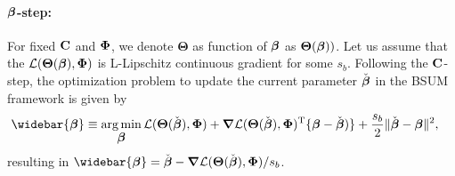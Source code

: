 \documentclass[12pt]{article}
\def\trans{^{\rm T}}
\newcommand{\bbL}{\mathcal{L}}
\DeclareMathOperator*{\argmin}{arg\,min}
\newcommand{\bs}{\boldsymbol}
\DeclareMathOperator{\Tr}{tr}
\begin{document}




\paragraph{$\mbox{\boldmath $\beta$}$-step:}\label{par:beta}
For fixed  ${\bf C}$ and $\mbox{\boldmath $\Phi$}$, we denote $\bs\Theta$ as function of $\mbox{\boldmath $\beta$}$ as $\bs\Theta(\bbeta))$. 
Let us assume that the $\bbL(\bs\Theta(\bbeta),\bPhi)$ is  L-Lipschitz continuous gradient for some $s_b$. Following the ${\bf C}$-step, the optimization problem to update the current parameter $\check{\mbox{\boldmath $\beta$}}$ in the BSUM framework is given by 
\begin{align}
\widebar{\bbeta} \equiv \argmin_{\bbeta} \bbL(\bs\Theta(\check{\bbeta}),\bPhi)  &+  \bs\nabla \bbL(\bs\Theta(\check{\bbeta}),\bPhi)\trans \{ \bbeta - \check{\bbeta})\}  +\frac{s_b}{2} \|\check{\bbeta} - \bbeta\|^2,
\end{align}
resulting in $\widebar{\bbeta}  = \check{\bbeta} - \bs\nabla \bbL(\bs\Theta(\check{\bbeta}),\bPhi)/s_b$. 
\end{document}
